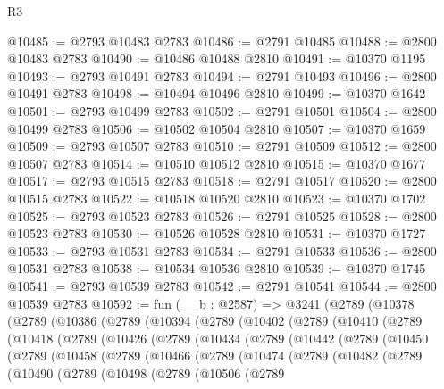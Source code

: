 \begin{lexlean}{R3}
\begin{coremodule}
@10485 := @2793 @10483 @2783
@10486 := @2791 @10485
@10488 := @2800 @10483 @2783
@10490 := @10486 @10488 @2810
@10491 := @10370 @1195
@10493 := @2793 @10491 @2783
@10494 := @2791 @10493
@10496 := @2800 @10491 @2783
@10498 := @10494 @10496 @2810
@10499 := @10370 @1642
@10501 := @2793 @10499 @2783
@10502 := @2791 @10501
@10504 := @2800 @10499 @2783
@10506 := @10502 @10504 @2810
@10507 := @10370 @1659
@10509 := @2793 @10507 @2783
@10510 := @2791 @10509
@10512 := @2800 @10507 @2783
@10514 := @10510 @10512 @2810
@10515 := @10370 @1677
@10517 := @2793 @10515 @2783
@10518 := @2791 @10517
@10520 := @2800 @10515 @2783
@10522 := @10518 @10520 @2810
@10523 := @10370 @1702
@10525 := @2793 @10523 @2783
@10526 := @2791 @10525
@10528 := @2800 @10523 @2783
@10530 := @10526 @10528 @2810
@10531 := @10370 @1727
@10533 := @2793 @10531 @2783
@10534 := @2791 @10533
@10536 := @2800 @10531 @2783
@10538 := @10534 @10536 @2810
@10539 := @10370 @1745
@10541 := @2793 @10539 @2783
@10542 := @2791 @10541
@10544 := @2800 @10539 @2783
@10592 := fun (__b : @2587) =>
  @3241
    (@2789
      (@10378
        (@2789
          (@10386
            (@2789
              (@10394
                (@2789
                  (@10402
                    (@2789
                      (@10410
                        (@2789
                          (@10418
                            (@2789
                              (@10426
                                (@2789
                                  (@10434
                                    (@2789
                                      (@10442
                                        (@2789
                                          (@10450
                                            (@2789
                                              (@10458
                                                (@2789
                                                  (@10466
                                                    (@2789
                                                      (@10474
                                                        (@2789
                                                          (@10482
                                                            (@2789
                                                              (@10490
                                                                (@2789
                                                                  (@10498
                                                                    (@2789
                                                                      (@10506
                                                                        (@2789

\end{coremodule}
\end{lexlean}
